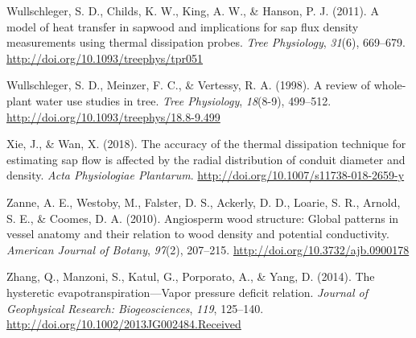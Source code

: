 \documentclass[11pt,twoside]{reedthesis}
\begin{document}
\hypertarget{ref-Wullschleger2011}{}
Wullschleger, S. D., Childs, K. W., King, A. W., \& Hanson, P. J.
(2011). A model of heat transfer in sapwood and implications for sap
flux density measurements using thermal dissipation probes. \emph{Tree
Physiology}, \emph{31}(6), 669--679.
\url{http://doi.org/10.1093/treephys/tpr051}

\hypertarget{ref-Wullschleger1998}{}
Wullschleger, S. D., Meinzer, F. C., \& Vertessy, R. A. (1998). A review
of whole-plant water use studies in tree. \emph{Tree Physiology},
\emph{18}(8-9), 499--512.
\url{http://doi.org/10.1093/treephys/18.8-9.499}

\hypertarget{ref-Xie2018}{}
Xie, J., \& Wan, X. (2018). The accuracy of the thermal dissipation
technique for estimating sap flow is affected by the radial distribution
of conduit diameter and density. \emph{Acta Physiologiae Plantarum}.
\url{http://doi.org/10.1007/s11738-018-2659-y}

\hypertarget{ref-Zanne2010}{}
Zanne, A. E., Westoby, M., Falster, D. S., Ackerly, D. D., Loarie, S.
R., Arnold, S. E., \& Coomes, D. A. (2010). Angiosperm wood structure:
Global patterns in vessel anatomy and their relation to wood density and
potential conductivity. \emph{American Journal of Botany}, \emph{97}(2),
207--215. \url{http://doi.org/10.3732/ajb.0900178}

\hypertarget{ref-Zhang2014}{}
Zhang, Q., Manzoni, S., Katul, G., Porporato, A., \& Yang, D. (2014).
The hysteretic evapotranspiration---Vapor pressure deficit relation.
\emph{Journal of Geophysical Research: Biogeosciences}, \emph{119},
125--140. \url{http://doi.org/10.1002/2013JG002484.Received}


\end{document}
